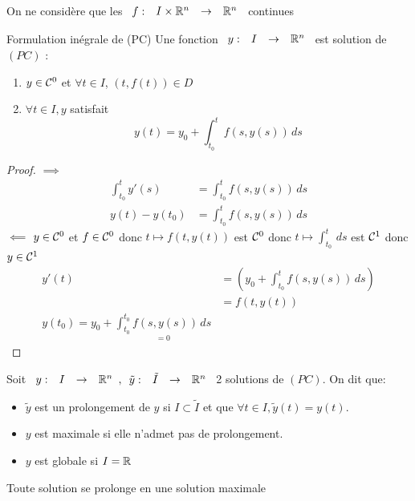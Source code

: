 \documentclass[]{report}
\begin{document}
    On ne considère que les $\begin{array}{ccccc} f : & I\times \mathbb{R}^n & \to & \mathbb{R}^n \end{array}$ continues

    \begin{prop}{Formulation inégrale de (PC)}{}
        Une fonction $\begin{array}{ccccc} y : & I & \to & \mathbb{R}^n \end{array}$ est solution de $(PC)$ \ssi:
        \begin{enumerate}
            \item $y\in \mathcal{C}^0$ et $\forall t\in I$, $(t,f(t))\in D$
            \item $\forall t\in I,y$ satisfait
            \[y(t)=y_0+\int_{t_0}^{t} f(s,y(s))\, ds\]
        \end{enumerate}
    \end{prop}

    \begin{proof}
        $\implies$\begin{align*}
            \int_{t_0}^{t} y'(s)&=\int_{t_0}^{t}f(s,y(s))\, ds\\
            y(t)-y(t_0)&=\int_{t_0}^{t} f(s,y(s))\, ds
        \end{align*}
        $\impliedby$ $y\in \mathcal{C}^0$ et $f\in \mathcal{C}^0$ donc $t\mapsto f(t,y(t))$ est $\mathcal{C}^0$ donc $t\mapsto \int_{t_0}^{t}\, ds$ est $\mathcal{C}^1$ donc $y\in \mathcal{C}^1$
        \begin{align*}
            y'(t)&=\left( y_0+\int_{t_0}^{t} f(s,y(s))\, ds\right)\\
            &=f(t,y(t))\\
            y(t_0)=y_0+\underset{=0}{\int_{t_0}^{t_0}f(s,y(s))\, ds}
        \end{align*}
    \end{proof}

    \begin{df}{}{}
        Soit $\begin{array}{ccccc} y : & I & \to & \mathbb{R}^n \end{array}, \begin{array}{ccccc} \tilde{y} : & \tilde{I} & \to & \mathbb{R}^n \end{array}$ 2 solutions de $(PC)$. On dit que:
        \begin{itemize}
            \item $\tilde{y}$ est un prolongement de $y$ si $I \subset \tilde{I}$ et que $\forall t\in I,\tilde{y}(t)=y(t)$.
            \item $y$ est maximale si elle n'admet pas de prolongement.
            \item $y$ est globale si $I=\mathbb{R}$
        \end{itemize}
    \end{df}

    \begin{tm}{}{}
        Toute solution se prolonge en une solution maximale
    \end{tm}
\end{document}
